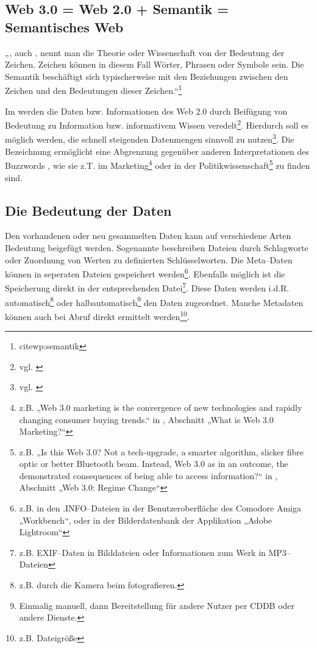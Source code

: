 \subsection{Web 3.0 = Web 2.0 + Semantik = Semantisches Web}

„, auch , nennt man die Theorie oder Wissenschaft von der Bedeutung der Zeichen. Zeichen können in diesem Fall Wörter, Phrasen oder Symbole sein. Die Semantik beschäftigt sich typischerweise mit den Beziehungen zwischen den Zeichen und den Bedeutungen dieser Zeichen.“\footnote{cite{wp:semantik}}

Im  werden die Daten bzw. Informationen des Web 2.0 durch Beifügung von Bedeutung zu Information bzw. informativem Wissen veredelt\footnote{vgl. \cite{nyt:markoff}}. Hierdurch soll es möglich werden, die schnell steigenden Datenmengen sinnvoll zu nutzen\footnote{vgl. \cite{tsp:tolksdorf}}. Die Bezeichnung  ermöglicht eine Abgrenzung gegenüber anderen Interpretationen des Buzzwords , wie sie z.T. im Marketing\footnote{z.B. „Web 3.0 marketing is the convergence of new technologies and rapidly changing consumer buying trends.“ in \cite{web3market}, Abschnitt „What is Web 3.0 Marketing?“} oder in der Politikwissenschaft\footnote{z.B. „Is this Web 3.0? Not a tech-upgrade, a smarter algorithm, slicker fibre optic or better Bluetooth beam. Instead, Web 3.0 as in an outcome, the demonstrated consequences of being able to access information?“ in \cite{web3pol}, Abschnitt „Web 3.0: Regime Change“} zu finden sind.

\subsection{Die Bedeutung der Daten}

Den vorhandenen oder neu gesammelten Daten kann auf verschiedene Arten Bedeutung beigefügt werden. Sogenannte  beschreiben Dateien durch Schlagworte oder Zuordnung von Werten zu definierten Schlüsselworten. Die Meta--Daten können in seperaten Dateien gespeichert werden\footnote{z.B. in den .INFO--Dateien in der Benutzeroberfläche des Comodore Amiga „Workbench“, oder in der Bilderdatenbank der Applikation „Adobe Lightroom“}. Ebenfalls möglich ist die Speicherung direkt in der entsprechenden Datei\footnote{z.B. EXIF--Daten in Bilddateien oder Informationen zum Werk in MP3--Dateien}. Diese Daten werden i.d.R. automatisch\footnote{z.B. durch die Kamera beim fotografieren.} oder halbautomatisch\footnote{Einmalig manuell, dann Bereitstellung für andere Nutzer per CDDB oder andere Dienste.} den Daten zugeordnet. Manche Metadaten können auch bei Abruf direkt ermittelt werden\footnote{z.B. Dateigröße}.

